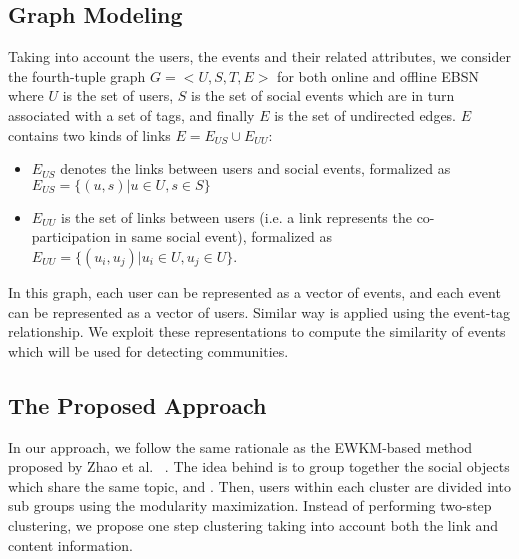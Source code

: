 \subsection{Graph Modeling}  \label{sec:modeling}
Taking into account the users, the events and their related attributes, we consider the fourth-tuple graph $G=<U,S,T,E>$ for both online and offline EBSN where $U$ is the set of users, $S$ is the set of social events which are in turn associated with a set of tags, and finally $E$ is the set of undirected edges. $E$ contains two kinds of links $E=E_{US} \cup E_{UU}$:
\begin{itemize}
\item $E_{US}$ denotes the links between users and social events, formalized as $E_{US}={\lbrace(u,s)| u \in U,s \in S \rbrace}$
\item $E_{UU}$ is the set of links between users (i.e. a link represents the co-participation in same social event), formalized as $E_{UU}={\lbrace(u_{i},u_{j})| u_{i} \in U,u_{j} \in U \rbrace}$. 
\end{itemize}

In this graph, each user can be represented as a vector of events, and each event can be represented as a vector of users. Similar way is applied using the event-tag relationship. We exploit these representations to compute the similarity of events which will be used for detecting communities.

\subsection{The Proposed Approach}   \label{sec:approach}
In our approach, we follow the same rationale as the EWKM-based method proposed by Zhao et al. ~\cite{Zhongying:12}. The idea behind is to group together the social objects which share the same topic, and  . Then, users within each cluster are divided into sub groups using the modularity maximization. Instead of performing two-step clustering, we propose one step clustering taking into account both the link and content information. 

